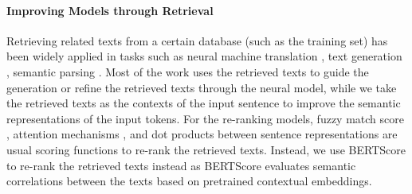 \documentclass[11pt,a4paper]{article}
\begin{document}
\paragraph{Improving Models through Retrieval}
Retrieving related texts from a certain database (such as the training set) has been widely applied in tasks such as neural machine translation \citep{gu2018search,zhang-etal-2018-guiding,xu-etal-2020-boosting}, text generation \citep{weston-etal-2018-retrieve,kim-etal-2020-retrieval}, semantic parsing \citep{hashimoto2018retrieve,guo-etal-2019-coupling}. Most of the work uses the retrieved texts to guide the generation or refine the retrieved texts through the neural model, while we take the retrieved texts as the contexts of the input sentence to improve the semantic representations of the input tokens.
For the re-ranking models, fuzzy match score \citep{gu2018search,zhang-etal-2018-guiding,hayati-etal-2018-retrieval,xu-etal-2020-boosting}, attention mechanisms \citep{cao-etal-2018-retrieve,cai-etal-2019-retrieval}, and dot products between sentence representations \citep{lewis2020retrieval,xu-etal-2020-boosting} are usual scoring functions to re-rank the retrieved texts. Instead, we use BERTScore to re-rank the retrieved texts instead as BERTScore evaluates semantic correlations between the texts based on pretrained contextual embeddings.
\end{document}
